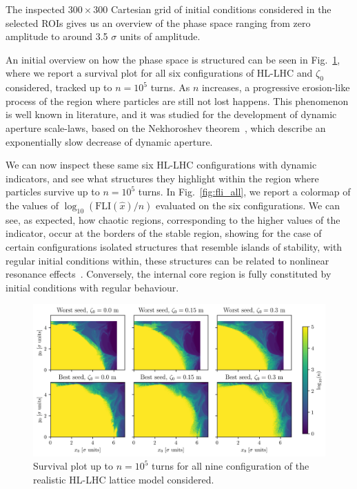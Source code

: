 The inspected $300\times300$ Cartesian grid of initial conditions considered in the selected ROIs gives us an overview of the phase space ranging from zero amplitude to around 3.5 $\sigma$ units of amplitude.

An initial overview on how the phase space is structured can be seen in Fig.~\ref{fig:true_survivors}, where we report a survival plot for all six configurations of HL-LHC and $\zeta_0$ considered, tracked up to $n=10^5$ turns. As $n$ increases, a progressive erosion-like process of the region where particles are still not lost happens. This phenomenon is well known in literature, and it was studied for the development of dynamic aperture scale-laws, based on the Nekhoroshev theorem~\cite{}, which describe an exponentially slow decrease of dynamic aperture.

We can now inspect these same six HL-LHC configurations with dynamic indicators, and see what structures they highlight within the region where particles survive up to $n=10^5$ turns. In Fig.~\ref{fig:fli_all}, we report a colormap of the values of $\log_{10}(\mathrm{FLI}(\hat{x})/n)$ evaluated on the six configurations. We can see, as expected, how chaotic regions, corresponding to the higher values of the indicator, occur at the borders of the stable region, showing for the case of certain configurations isolated structures that resemble islands of stability, with regular initial conditions within, these structures can be related to nonlinear resonance effects~\cite{}. Conversely, the internal core region is fully constituted by initial conditions with regular behaviour.

\begin{figure}
    \centering
    \includegraphics[width=1.0\textwidth]{6_lhc_dynamic_indicators/figs/stability.png}
    \caption{Survival plot up to $n=10^5$ turns for all nine configuration of the realistic HL-LHC lattice model considered.}
    \label{fig:true_survivors}
\end{figure}


